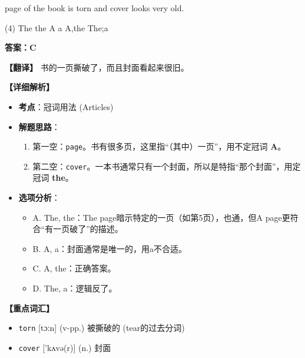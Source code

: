 \documentclass[11pt, a4paper]{article}
\newcommand{\analysis}[4]{
    \begin{solutionbox}
        \textbf{答案：#1}
        
        \textbf{【翻译】} #2
        
        \textbf{【详细解析】}
        #3
        
        \textbf{【重点词汇】}
        #4
    \end{solutionbox}
}
\newcommand{\blank}{\underline{\hspace{1.5cm}}}
\begin{document}
\begin{questions}
    \item \blank page of the book is torn and \blank cover looks very old.
    \begin{tasks}(4)
        \task The the \task A a \task A,the \task The;a
    \end{tasks}
    \analysis{C}{书的一页撕破了，而且封面看起来很旧。}{
        \begin{itemize}
            \item \textbf{考点}：冠词用法 (Articles)
            \item \textbf{解题思路}：
                \begin{enumerate}
                    \item 第一空：\texttt{page}。书有很多页，这里指“（其中）一页”，用不定冠词 \textbf{A}。
                    \item 第二空：\texttt{cover}。一本书通常只有一个封面，所以是特指“那个封面”，用定冠词 \textbf{the}。
                \end{enumerate}
            \item \textbf{选项分析}：
                \begin{itemize}
                    \item A. The, the：The page暗示特定的一页（如第5页），也通，但A page更符合“有一页破了”的描述。
                    \item B. A, a：封面通常是唯一的，用a不合适。
                    \item C. A, the：正确答案。
                    \item D. The, a：逻辑反了。
                \end{itemize}
        \end{itemize}
    }{
        \begin{itemize}
            \item \texttt{torn} [tɔːn] (v-pp.) 被撕破的 (tear的过去分词)
            \item \texttt{cover} ['kʌvə(r)] (n.) 封面
        \end{itemize}
    }


\end{questions}
\end{document}
